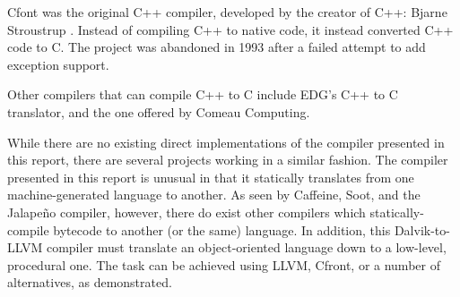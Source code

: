 Cfont was the original C++ compiler, developed by the creator of C++: Bjarne Stroustrup \cite{Stroustrup:2007:ELR:1238844.1238848}. Instead of compiling C++ to native code, it instead converted C++ code to C. The project was abandoned in 1993 after a failed attempt to add exception support.

Other compilers that can compile C++ to C include EDG's C++ to C translator\footnotemark {}, and the one offered by Comeau Computing\footnotemark {}.

While there are no existing direct implementations of the compiler presented in this report, there are several projects working in a similar fashion. The compiler presented in this report is unusual in that it statically translates from one machine-generated language to another. As seen by Caffeine, Soot, and the Jalape\~{n}o compiler, however, there do exist other compilers which statically-compile bytecode to another (or the same) language. In addition, this Dalvik-to-LLVM compiler must translate an object-oriented language down to a low-level, procedural one. The task can be achieved using LLVM, Cfront, or a number of alternatives, as demonstrated.
